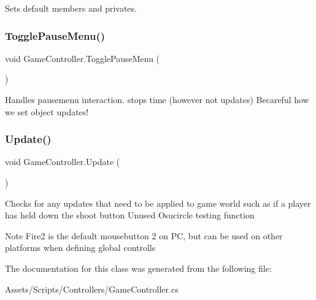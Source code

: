 Sets default members and privates. \mbox{\label{class_game_controller_a0b2f5dd3890fd4897ca83421d9ce439c}} 
\subsubsection{\texorpdfstring{Toggle\+Pause\+Menu()}{TogglePauseMenu()}}
{\footnotesize\ttfamily void Game\+Controller.\+Toggle\+Pause\+Menu (\begin{DoxyParamCaption}{ }\end{DoxyParamCaption})}

Handles pausemenu interaction. stops time (however not updates) Becareful how we set object updates! \mbox{\label{class_game_controller_a5a89277529cadb49af7d55eba3bbf056}} 
\subsubsection{\texorpdfstring{Update()}{Update()}}
{\footnotesize\ttfamily void Game\+Controller.\+Update (\begin{DoxyParamCaption}{ }\end{DoxyParamCaption})\hspace{0.3cm}{\ttfamily [private]}}

Checks for any updates that need to be applied to game world such as if a player has held down the shoot button Unused Osucircle testing function

\begin{DoxyNote}{Note}
Fire2 is the default mousebutton 2 on PC, but can be used on other platforms when defining global controlls 
\end{DoxyNote}


The documentation for this class was generated from the following file\+:\begin{DoxyCompactItemize}
\item 
Assets/\+Scripts/\+Controllers/Game\+Controller.\+cs\end{DoxyCompactItemize}
